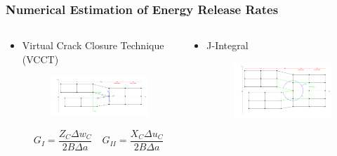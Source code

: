 \documentclass[first,firstsupp,lastsupp,last,hyperref,table]{ETHclass}
\begin{document}
\begin{frame}
\frametitle{\small Numerical Estimation of Energy Release Rates}
\vspace{-0.4cm}
\centering
\scriptsize
\begin{columns}
\begin{column}{0.5\textwidth}
\centering
\vspace*{-1.4cm}
\begin{itemize}[label=]
\item Virtual Crack Closure Technique (VCCT)
\begin{figure}
\includegraphics[width=\columnwidth]{VCCT.pdf}
  \label{fig:vcct}
\end{figure}

\begin{equation*}
G_{I}=\frac{Z_{C}\Delta w_{C}}{2B\Delta a}\quad G_{II}=\frac{X_{C}\Delta u_{C}}{2B\Delta a}
\end{equation*}

\end{itemize}
\end{column}
\begin{column}{0.5\textwidth}
\centering
\begin{itemize}[label=]
\item J-Integral

\begin{figure}
\includegraphics[width=\columnwidth]{J-integral.pdf}
  \label{fig:jintegral}
\end{figure}


\end{itemize}
\end{column}
\end{columns}
\end{frame}
\end{document}
